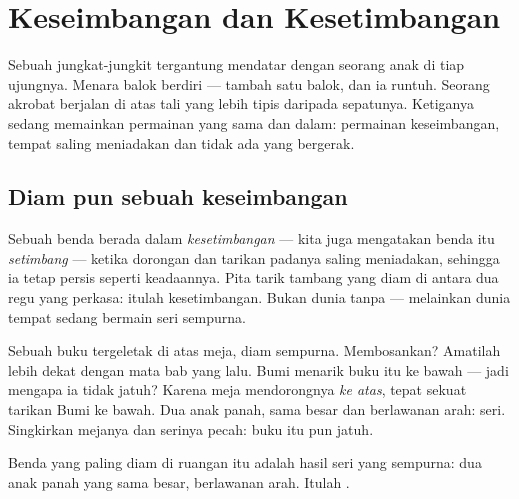 \chapter{Keseimbangan dan Kesetimbangan}\label{ch:g2:balance-equilibrium}

Sebuah jungkat-jungkit tergantung mendatar dengan seorang anak di tiap
ujungnya. Menara balok berdiri --- tambah satu balok, dan ia runtuh.
Seorang akrobat berjalan di atas tali yang lebih tipis daripada
sepatunya. Ketiganya sedang memainkan permainan yang sama dan dalam:
permainan keseimbangan, tempat  saling meniadakan dan tidak ada
yang bergerak.

\section{Diam pun sebuah keseimbangan}

\begin{definition}[Kesetimbangan]\label{def:g2:balance-equilibrium:equilibrium}
Sebuah benda berada dalam \emph{kesetimbangan}
--- kita juga mengatakan benda itu \emph{setimbang}
--- ketika dorongan dan tarikan padanya saling meniadakan, sehingga ia
tetap persis seperti keadaannya. Pita tarik tambang yang diam di
antara dua regu yang perkasa: itulah kesetimbangan. Bukan dunia tanpa
 --- melainkan dunia tempat  sedang bermain seri sempurna.
\end{definition}

\begin{example}\label{ex:g2:balance-equilibrium:book}
Sebuah buku tergeletak di atas meja, diam sempurna. Membosankan?
Amatilah lebih dekat dengan mata bab yang lalu. Bumi menarik buku itu
ke bawah --- jadi mengapa ia tidak jatuh? Karena meja mendorongnya
\emph{ke atas}, tepat sekuat tarikan Bumi ke bawah. Dua anak panah,
sama besar dan berlawanan arah: seri. Singkirkan mejanya dan serinya
pecah: buku itu pun jatuh.
\end{example}

\begin{omfigure}

{\small Benda yang paling diam di ruangan itu adalah hasil seri yang
sempurna: dua anak panah yang sama besar, berlawanan arah. Itulah
.}
\end{omfigure}

